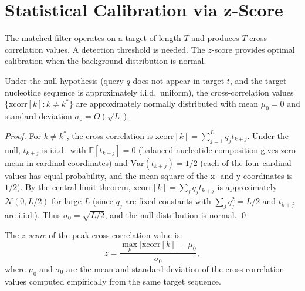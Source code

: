 \section{Statistical Calibration via z-Score}
\label{sec:z_score}

The matched filter operates on a target of length $T$ and produces $T$
cross-correlation values. A detection threshold is needed. The $z$-score
provides optimal calibration when the background distribution is normal.

\begin{proposition}
\label{prop:null_normal}
Under the null hypothesis (query $q$ does not appear in target $t$, and the
target nucleotide sequence is approximately i.i.d.\ uniform), the cross-correlation
values $\{\mathrm{xcorr}[k] : k \neq k^*\}$ are approximately normally distributed
with mean $\mu_0 = 0$ and standard deviation $\sigma_0 = O(\sqrt{L})$.
\end{proposition}

\begin{proof}
For $k \neq k^*$, the cross-correlation is $\mathrm{xcorr}[k] = \sum_{j=1}^L q_j t_{k+j}$.
Under the null, $t_{k+j}$ is i.i.d.\ with $\mathbb{E}[t_{k+j}] = 0$ (balanced
nucleotide composition gives zero mean in cardinal coordinates) and
$\mathrm{Var}(t_{k+j}) = 1/2$ (each of the four cardinal values has equal
probability, and the mean square of the x- and y-coordinates is $1/2$).
By the central limit theorem, $\mathrm{xcorr}[k] = \sum_j q_j t_{k+j}$ is
approximately $\mathcal{N}(0, L/2)$ for large $L$ (since $q_j$ are fixed
constants with $\sum_j q_j^2 = L/2$ and $t_{k+j}$ are i.i.d.). Thus
$\sigma_0 = \sqrt{L/2}$, and the null distribution is normal. \qed
\end{proof}

\begin{definition}
\label{def:zscore}
The \emph{$z$-score} of the peak cross-correlation value is:
\begin{equation}
  z = \frac{\max_k |\mathrm{xcorr}[k]| - \mu_0}{\sigma_0},
  \label{eq:zscore}
\end{equation}
where $\mu_0$ and $\sigma_0$ are the mean and standard deviation of the
cross-correlation values computed empirically from the same target sequence.
\end{definition}

